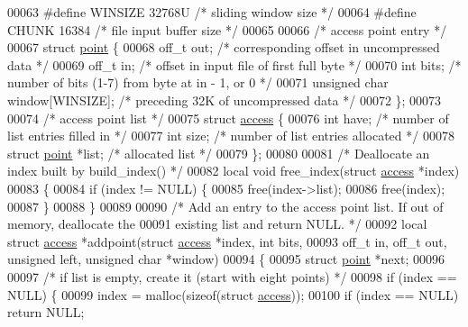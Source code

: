 \begin{DoxyCode}
00063 \textcolor{preprocessor}{#define WINSIZE 32768U      }\textcolor{comment}{/* sliding window size */}\textcolor{preprocessor}{}
00064 \textcolor{preprocessor}{#define CHUNK 16384         }\textcolor{comment}{/* file input buffer size */}\textcolor{preprocessor}{}
00065 
00066 \textcolor{comment}{/* access point entry */}
00067 \textcolor{keyword}{struct }\hyperlink{structpoint}{point} \{
00068     off\_t out;          \textcolor{comment}{/* corresponding offset in uncompressed data */}
00069     off\_t in;           \textcolor{comment}{/* offset in input file of first full byte */}
00070     \textcolor{keywordtype}{int} bits;           \textcolor{comment}{/* number of bits (1-7) from byte at in - 1, or 0 */}
00071     \textcolor{keywordtype}{unsigned} \textcolor{keywordtype}{char} window[WINSIZE];  \textcolor{comment}{/* preceding 32K of uncompressed data */}
00072 \};
00073 
00074 \textcolor{comment}{/* access point list */}
00075 \textcolor{keyword}{struct }\hyperlink{structaccess}{access} \{
00076     \textcolor{keywordtype}{int} have;           \textcolor{comment}{/* number of list entries filled in */}
00077     \textcolor{keywordtype}{int} size;           \textcolor{comment}{/* number of list entries allocated */}
00078     \textcolor{keyword}{struct }\hyperlink{structpoint}{point} *list; \textcolor{comment}{/* allocated list */}
00079 \};
00080 
00081 \textcolor{comment}{/* Deallocate an index built by build\_index() */}
00082 local \textcolor{keywordtype}{void} free\_index(\textcolor{keyword}{struct} \hyperlink{structaccess}{access} *index)
00083 \{
00084     \textcolor{keywordflow}{if} (index != NULL) \{
00085         free(index->list);
00086         free(index);
00087     \}
00088 \}
00089 
00090 \textcolor{comment}{/* Add an entry to the access point list.  If out of memory, deallocate the}
00091 \textcolor{comment}{   existing list and return NULL. */}
00092 local \textcolor{keyword}{struct }\hyperlink{structaccess}{access} *addpoint(\textcolor{keyword}{struct} \hyperlink{structaccess}{access} *index, \textcolor{keywordtype}{int} bits,
00093     off\_t in, off\_t out, \textcolor{keywordtype}{unsigned} left, \textcolor{keywordtype}{unsigned} \textcolor{keywordtype}{char} *window)
00094 \{
00095     \textcolor{keyword}{struct }\hyperlink{structpoint}{point} *next;
00096 
00097     \textcolor{comment}{/* if list is empty, create it (start with eight points) */}
00098     \textcolor{keywordflow}{if} (index == NULL) \{
00099         index = malloc(\textcolor{keyword}{sizeof}(\textcolor{keyword}{struct} \hyperlink{structaccess}{access}));
00100         \textcolor{keywordflow}{if} (index == NULL) \textcolor{keywordflow}{return} NULL;

\end{DoxyCode}
